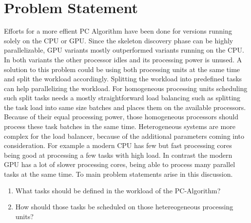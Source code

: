 \chapter{Problem Statement}
Efforts for a more effient PC Algorithm have been done for versions running solely on the CPU or GPU. Since the skeleton discovery phase can be highly parallelizable, GPU variants mostly outperformed variants running on the CPU. In both variants the other processor idles and its processing power is unused. A solution to this problem could be using both processing units at the same time and split the workload accordingly.
Splitting the workload into predefined tasks can help parallelizing the workload. For homogeneous processing units scheduling such split tasks needs a mostly straightforward load balancing such as splitting the task load into same size batches and places them on the available processors.
Because of their equal processing power, those homogeneous processors should process these task batches in the same time.
Heterogeneous systems are more complex for the load balancer, because of the additional parameters coming into consideration. For example a modern CPU has few but fast processing cores being good at processing a few tasks with high load. In contrast the modern GPU has a lot of slower processing cores, being able to process many parallel tasks at the same time.
To main problem statements arise in this discussion.

\begin{enumerate}
  \item What tasks should be defined in the workload of the PC-Algorithm?
  \item How should those tasks be scheduled on those hetereogeneous processing units?
\end{enumerate}

